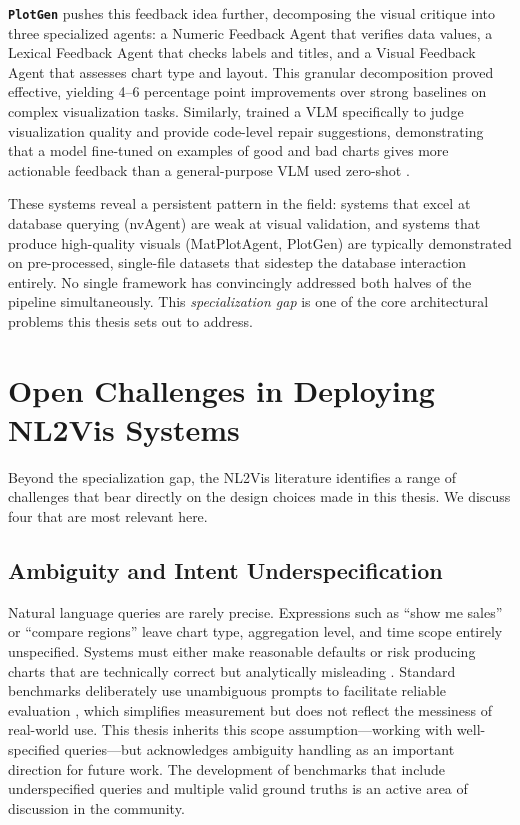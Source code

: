 \documentclass[a4paper,oneside,bibliography=totoc]{scrbook}
\begin{document}
\textbf{\texttt{PlotGen}} \cite{goswami2025plotgen} pushes this feedback idea further, decomposing the visual critique into three specialized agents: a Numeric Feedback Agent that verifies data values, a Lexical Feedback Agent that checks labels and titles, and a Visual Feedback Agent that assesses chart type and layout. This granular decomposition proved effective, yielding 4--6 percentage point improvements over strong baselines on complex visualization tasks. Similarly, \citeauthor{shi2025visref} trained a VLM specifically to judge visualization quality and provide code-level repair suggestions, demonstrating that a model fine-tuned on examples of good and bad charts gives more actionable feedback than a general-purpose VLM used zero-shot \cite{shi2025visref}.

These systems reveal a persistent pattern in the field: systems that excel at database querying (nvAgent) are weak at visual validation, and systems that produce high-quality visuals (MatPlotAgent, PlotGen) are typically demonstrated on pre-processed, single-file datasets that sidestep the database interaction entirely. No single framework has convincingly addressed both halves of the pipeline simultaneously. This \emph{specialization gap} is one of the core architectural problems this thesis sets out to address.

\section{Open Challenges in Deploying NL2Vis Systems}
\label{sec:challenges}

Beyond the specialization gap, the NL2Vis literature identifies a range of challenges that bear directly on the design choices made in this thesis. We discuss four that are most relevant here.

\subsection{Ambiguity and Intent Underspecification}

Natural language queries are rarely precise. Expressions such as ``show me sales'' or ``compare regions'' leave chart type, aggregation level, and time scope entirely unspecified. Systems must either make reasonable defaults or risk producing charts that are technically correct but analytically misleading \cite{maddigan2023chat2vis}. Standard benchmarks deliberately use unambiguous prompts to facilitate reliable evaluation \cite{chen2025viseval}, which simplifies measurement but does not reflect the messiness of real-world use. This thesis inherits this scope assumption---working with well-specified queries---but acknowledges ambiguity handling as an important direction for future work. The development of benchmarks that include underspecified queries and multiple valid ground truths is an active area of discussion in the community.
\end{document}

